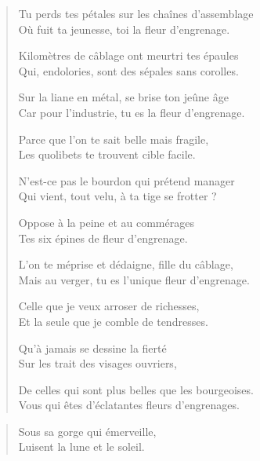\begin{verse}\distique
  Tu perds tes pétales sur les chaînes d’assemblage\\  %
  Où fuit ta jeunesse, toi la fleur d’engrenage.

  Kilomètres de câblage ont meurtri tes épaules\\  %
  Qui, endolories,  sont des sépales sans corolles.

  Sur la liane en métal, se brise ton jeûne âge\\  %
  Car pour l’industrie, tu es la fleur d’engrenage.

  Parce que l’on te sait belle mais fragile,\\  %
  Les quolibets te trouvent cible facile. 

  N’est-ce pas le bourdon qui prétend manager\\   %
  Qui vient, tout velu, à ta tige se frotter ? 

  Oppose à la peine et au commérages\\   %
  Tes six épines de fleur d’engrenage. 

  L’on te méprise et dédaigne, fille du câblage,\\   %
  Mais au verger, tu es l’unique fleur d’engrenage. 

  Celle que je veux arroser de richesses,\\   %
  Et la seule que je comble de tendresses. 

  Qu’à jamais se dessine la fierté\\   %
  Sur les trait des visages ouvriers, 

  De celles qui sont plus belles que les bourgeoises.\\   %
  Vous qui êtes d’éclatantes fleurs d’engrenages. 
\end{verse}

\begin{verse}\distique%
  Sous sa gorge qui émerveille,\\  %
  Luisent la lune et le soleil.
\end{verse}

